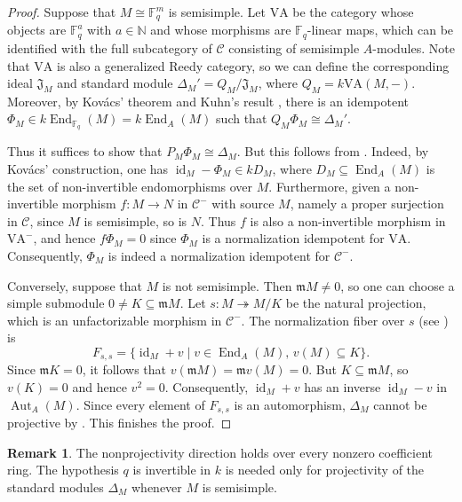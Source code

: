 \documentclass[10pt, reqno]{amsart}
\theoremstyle{plain}
\numberwithin{equation}{section}
\theoremstyle{definition}
\newtheorem{remark}[theorem]{Remark}
\newcommand{\End}{\operatorname{End}}
\newcommand{\Aut}{\operatorname{Aut}}
\newcommand{\id}{\operatorname{id}}
\newcommand{\C}{\mathscr C}
\begin{document}
\begin{proof}
Suppose that $M \cong \mathbb{F}_q^m$ is semisimple. Let $\mathrm{VA}$ be the category whose objects are $\mathbb{F}_q^a$ with $a \in \mathbb{N}$ and whose morphisms are $\mathbb{F}_q$-linear maps, which can be identified with the full subcategory of $\C$ consisting of semisimple $A$-modules. Note that $\mathrm{VA}$ is also a generalized Reedy category, so we can define the corresponding ideal $\mathfrak{J}_M$ and standard module $\Delta_M' = Q_M / \mathfrak{J}_M$, where $Q_M = k\mathrm{VA}(M, -)$. Moreover, by Kov\'{a}cs' theorem \cite{Kovacs} and Kuhn's result \cite{Kuhn}, there is an idempotent $\Phi_M \in k\End_{\mathbb{F}_q}(M) = k\End_A(M)$ such that $Q_M \Phi_M \cong \Delta_M'$.

Thus it suffices to show that $P_M \Phi_M \cong \Delta_M$. But this follows from \cite[Definition 2.11 and Theorem 2.12]{LiNorm}. Indeed, by Kov\'{a}cs' construction, one has $\id_M - \Phi_M \in kD_M$, where $D_M \subseteq \End_A(M)$ is the set of non-invertible endomorphisms over $M$. Furthermore, given a non-invertible morphism $f: M \to N$ in $\C^-$ with source $M$, namely a proper surjection in $\C$, since $M$ is semisimple, so is $N$. Thus $f$ is also a non-invertible morphism in $\mathrm{VA}^-$, and hence $f \Phi_M = 0$ since $\Phi_M$ is a normalization idempotent for $\mathrm{VA}$. Consequently, $\Phi_M$ is indeed a normalization idempotent for $\C^-$.

Conversely, suppose that $M$ is not semisimple. Then $\mathfrak m M \neq0$, so one can choose a simple submodule $0 \neq K \subseteq \mathfrak mM$. Let $s: M \twoheadrightarrow M/K$ be the natural projection, which is an unfactorizable morphism in $\C^-$. The normalization fiber over $s$ (see \cite[Subsection 2.2]{LiNorm}) is
\[
F_{s,s} = \{\id_M + v \mid v \in \End_A(M), \, v(M) \subseteq K\}.
\]
Since $\mathfrak{m} K = 0$, it follows that $v(\mathfrak{m} M) = \mathfrak{m} v(M) = 0$. But $K \subseteq \mathfrak{m}M$, so $v(K) = 0$ and hence $v^2 = 0$. Consequently, $\id_M + v$ has an inverse $\id_M-v$ in $\Aut_A(M)$. Since every element of $F_{s,s}$ is an automorphism, $\Delta_M$ cannot be projective by \cite[Corollary 2.8]{LiNorm}. This finishes the proof.
\end{proof}

\begin{remark}
The nonprojectivity direction holds over every nonzero coefficient ring. The hypothesis $q$ is invertible in $k$ is needed only for projectivity of the standard modules $\Delta_M$ whenever $M$ is semisimple.
\end{remark}
\end{document}

